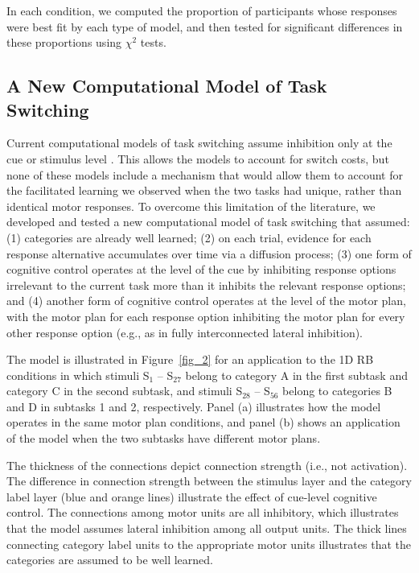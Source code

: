 \documentclass[doc, floatsintext]{apa7}
\begin{document}
In each condition, we computed the proportion of
participants whose responses were best fit by each type of
model, and then tested for significant differences in these
proportions using $\chi^2$ tests.

\subsection{A New Computational Model of Task Switching}
Current computational models of task switching assume
inhibition only at the cue or stimulus level
\parencite{botvinick_conflict_2001,
blais_item-specific_2007, verguts_hebbian_2008,
abrahamse_grounding_2016}. This allows the models to account
for switch costs, but none of these models include a
mechanism that would allow them to account for the
facilitated learning we observed when the two tasks had
unique, rather than identical motor responses. To overcome
this limitation of the literature, we developed and tested a
new computational model of task switching that assumed: (1)
categories are already well learned; (2) on each trial,
evidence for each response alternative accumulates over time
via a diffusion process; (3) one form of cognitive control
operates at the level of the cue by inhibiting response
options irrelevant to the current task more than it inhibits
the relevant response options; and (4) another form of
cognitive control operates at the level of the motor plan,
with the motor plan for each response option inhibiting the
motor plan for every other response option (e.g., as in
fully interconnected lateral inhibition). 

The model is illustrated in Figure~\ref{fig_2} for an
application to the 1D RB conditions in which stimuli S$_1$
-- S$_{27}$ belong to category A in the first subtask and
category C in the second subtask, and stimuli S$_{28}$ --
S$_{56}$ belong to categories B and D in subtasks 1 and 2,
respectively. Panel (a) illustrates how the model operates
in the same motor plan conditions, and panel (b) shows an
application of the model when the two subtasks have
different motor plans. 

The thickness of the connections depict connection strength
(i.e., not activation). The difference in connection
strength between the stimulus layer and the category label
layer (blue and orange lines) illustrate the effect of
cue-level cognitive control. The connections among motor
units are all inhibitory, which illustrates that the model
assumes lateral inhibition among all output units. The thick
lines connecting category label units to the appropriate
motor units illustrates that the categories are assumed to
be well learned.
\end{document}
